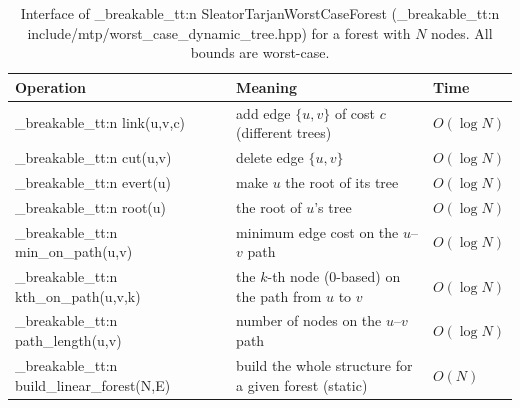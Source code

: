 \documentclass[11pt,a4paper,oneside]{report}
\theoremstyle{plain}
\theoremstyle{definition}
\theoremstyle{remark}
\DeclareRobustCommand{\code}[1]{\mtp_breakable_tt:n {#1}}
\DeclareRobustCommand{\file}[1]{\mtp_breakable_tt:n {#1}}
\begin{document}
\begin{table}[ht]
\centering\small
\caption[Dynamic-tree interface used by A2]{Interface of \code{SleatorTarjanWorstCaseForest}
(\file{include/mtp/worst_case_dynamic_tree.hpp}) for a forest with \(N\) nodes. All bounds are
worst-case.}\label{tab:st-interface}
\begin{tabularx}{\textwidth}{@{}lXl@{}}
\toprule
\textbf{Operation} & \textbf{Meaning} & \textbf{Time}\\
\midrule
\code{link(u,v,c)} & add edge \(\{u,v\}\) of cost \(c\) (different trees) & \(O(\log N)\)\\
\code{cut(u,v)} & delete edge \(\{u,v\}\) & \(O(\log N)\)\\
\code{evert(u)} & make \(u\) the root of its tree & \(O(\log N)\)\\
\code{root(u)} & the root of \(u\)'s tree & \(O(\log N)\)\\
\code{min_on_path(u,v)} & minimum edge cost on the \(u\)--\(v\) path & \(O(\log N)\)\\
\code{kth_on_path(u,v,k)} & the \(k\)-th node (0-based) on the path from \(u\) to \(v\) & \(O(\log N)\)\\
\code{path_length(u,v)} & number of nodes on the \(u\)--\(v\) path & \(O(\log N)\)\\
\code{build_linear_forest(N,E)} & build the whole structure for a given forest (static) & \(O(N)\)\\
\bottomrule
\end{tabularx}
\end{table}
\end{document}
